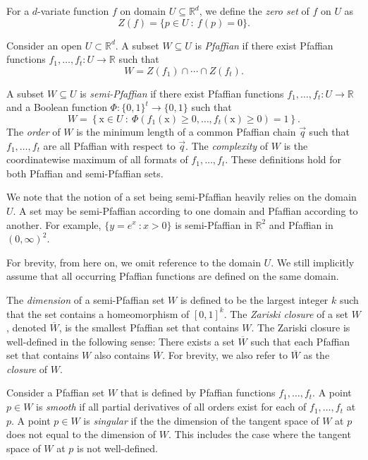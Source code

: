 \documentclass[11pt]{article}
\theoremstyle{definition}
\newcommand{\parag}[1]{\vspace{2mm}
\noindent{\bf #1} }
\newcommand{\RR}{\mathbb R}
\newcommand{\vecx}{\mathrm{x}}
\begin{document}
\parag{Pfaffian sets.}
For a $d$-variate function $f$ on domain $U \subseteq \RR^d$, we define the \emph{zero set} of $f$ on $U$ as 
%
\[ Z(f) = \{p\in U\ :\ f(p) = 0\}. \]

Consider an open $U\subset \RR^d$.
A subset $W \subseteq U$ is \emph{Pfaffian} if there exist Pfaffian functions $f_1,\ldots,f_t: U \to \RR$ such that 
%
\[ W = Z(f_1)\cap \cdots \cap Z(f_t). \]
 
A subset $W \subseteq U$ is \emph{semi-Pfaffian} if there exist Pfaffian functions $f_1,\ldots,f_t: U \to \RR$ and a Boolean function $\Phi: \{0, 1\}^t \to \{0, 1\}$ such that 
%
\begin{equation*}
W = \left\{ \vecx \in U\ :\ \Phi\left(f_1(\vecx) \ge 0, \ldots, f_t(\vecx) \ge 0\right) = 1 \right\}.
\end{equation*}
%
The \emph{order} of $W$ is the minimum length of a common Pfaffian chain $\vec{q}$ such that $f_1,\ldots,f_t$ are all Pfaffian with respect to $\vec{q}$.
The \emph{complexity} of $W$ is the coordinatewise maximum of all formats of $f_1,\ldots,f_t$.
These definitions hold for both Pfaffian and semi-Pfaffian sets.

We note that the notion of a set being semi-Pfaffian heavily relies on the domain $U$. 
A set may be semi-Pfaffian according to one domain and Pfaffian according to another. 
For example, $\{y=e^x\ : x>0\}$ is semi-Pfaffian in $\RR^2$ and Pfaffian in $(0,\infty)^2$.

For brevity, from here on, we omit reference to the domain $U$. 
We still implicitly assume that all occurring
Pfaffian functions are defined on the same domain.

The \emph{dimension} of a semi-Pfaffian set $W$ is defined to be the largest integer $k$ such that the set contains a homeomorphism of $[0,1]^k$.
The \emph{Zariski closure} of a set $W$, denoted $\overline{W}$, is the smallest Pfaffian set that contains $W$.
The Zariski closure is well-defined in the following sense: 
There exists a set $\overline{W}$ such that each Pfaffian set that contains $W$ also contains $\overline{W}$.
For brevity, we also refer to $\overline{W}$ as the \emph{closure} of $W$.

Consider a Pfaffian set $W$ that is defined by Pfaffian functions $f_1,\ldots,f_t$.
A point $p\in W$ is \emph{smooth} if all partial derivatives of all orders exist for each of $f_1,\ldots,f_t$ at $p$.
A point $p\in W$ is \emph{singular} if the the dimension of the tangent space of $W$ at $p$ does not equal to the dimension of $W$. 
This includes the case where the tangent space of $W$ at $p$ is not well-defined. 
\end{document}
